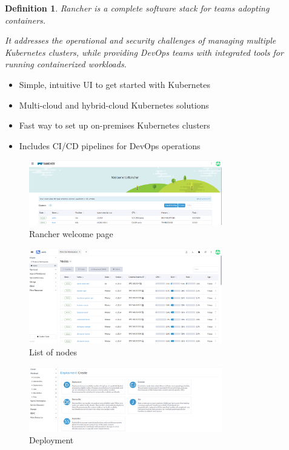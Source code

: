 \documentclass{article}
\newtheorem{theorem}{Definition}[section]
\begin{document}
\begin{theorem}
    Rancher is a complete software stack for teams adopting containers. 

    It addresses the operational and security challenges of managing multiple Kubernetes clusters, 
    while providing DevOps teams with integrated tools for running containerized workloads.
\end{theorem}

\begin{itemize}
    \item Simple, intuitive UI to get started with Kubernetes
    \item Multi-cloud and hybrid-cloud Kubernetes solutions
    \item Fast way to set up on-premises Kubernetes clusters
    \item Includes CI/CD pipelines for DevOps operations
\end{itemize}

\begin{figure}[H]
    \centering
    \includegraphics[width=0.75\textwidth]{img/rancher.png}
    \caption{Rancher welcome page}
\end{figure}

\begin{figure}[H]
    \centering
    \includegraphics[width=0.75\textwidth]{img/rancher2.png}
    \caption{List of nodes}
\end{figure}

\begin{figure}[H]
    \centering
    \includegraphics[width=0.75\textwidth]{img/rancher3.png}
    \caption{Deployment}
\end{figure}
\end{document}

